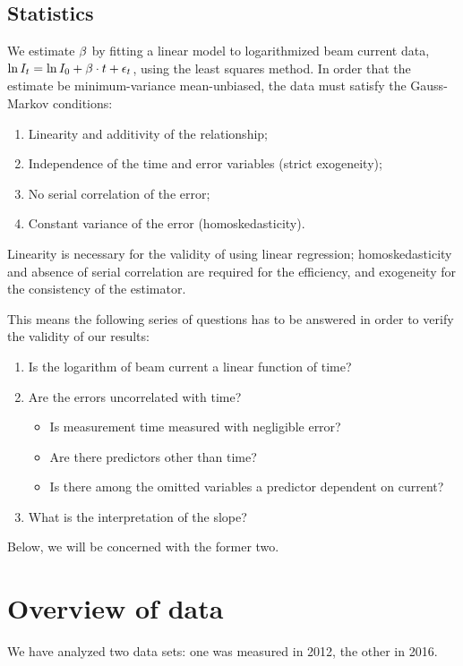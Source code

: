 \documentclass[reprint]{revtex4-1}
\begin{document}
\subsection{Statistics}

We estimate $\slp$ by fitting a linear model to logarithmized beam current data, $\ln I_t = \ln I_0 + \slp\cdot t + \epsilon_t$, using the least squares method. In order that the estimate be minimum-variance mean-unbiased, the data must satisfy the Gauss-Markov conditions:~\cite{GaussMarkov}
\begin{enumerate}
	\item Linearity and additivity of the relationship;
	\item Independence of the time and error variables (strict exogeneity);
	\item No serial correlation of the error;
	\item Constant variance of the error (homoskedasticity).
\end{enumerate}

Linearity is necessary for the validity of using linear regression; homoskedasticity and absence of serial correlation are required for the efficiency, and exogeneity for the consistency of the estimator.

This means the following series of questions has to be answered in order to verify the validity of our results:
\begin{enumerate}
	\item Is the logarithm of beam current a linear function of time?
	\item Are the errors uncorrelated with time?
		\begin{itemize}
			\item Is measurement time measured with negligible error?
			\item Are there predictors other than time?
			\item Is there among the omitted variables a predictor dependent on current?
		\end{itemize}
	\item What is the interpretation of the slope?
\end{enumerate}

Below, we will be concerned with the former two.

\section{Overview of data}
We have analyzed two data sets: one was measured in 2012, the other in 2016. 
\end{document}
